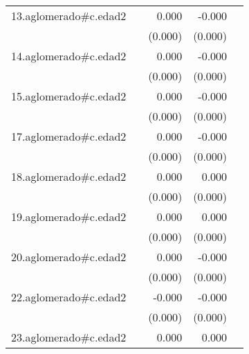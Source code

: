 {\begin{longtable}{l*{4}{D{.}{.}{-1}}}
\addlinespace
13.aglomerado#c.edad2&                     &       0.000         &      -0.000         &                     \\
            &                     &     (0.000)         &     (0.000)         &                     \\
\addlinespace
14.aglomerado#c.edad2&                     &       0.000\sym{*}  &      -0.000         &                     \\
            &                     &     (0.000)         &     (0.000)         &                     \\
\addlinespace
15.aglomerado#c.edad2&                     &       0.000         &      -0.000         &                     \\
            &                     &     (0.000)         &     (0.000)         &                     \\
\addlinespace
17.aglomerado#c.edad2&                     &       0.000         &      -0.000\sym{*}  &                     \\
            &                     &     (0.000)         &     (0.000)         &                     \\
\addlinespace
18.aglomerado#c.edad2&                     &       0.000\sym{*}  &       0.000         &                     \\
            &                     &     (0.000)         &     (0.000)         &                     \\
\addlinespace
19.aglomerado#c.edad2&                     &       0.000         &       0.000         &                     \\
            &                     &     (0.000)         &     (0.000)         &                     \\
\addlinespace
20.aglomerado#c.edad2&                     &       0.000         &      -0.000         &                     \\
            &                     &     (0.000)         &     (0.000)         &                     \\
\addlinespace
22.aglomerado#c.edad2&                     &      -0.000         &      -0.000\sym{***}&                     \\
            &                     &     (0.000)         &     (0.000)         &                     \\
\addlinespace
23.aglomerado#c.edad2&                     &       0.000\sym{***}&       0.000         &                     \\

\end{longtable}}
